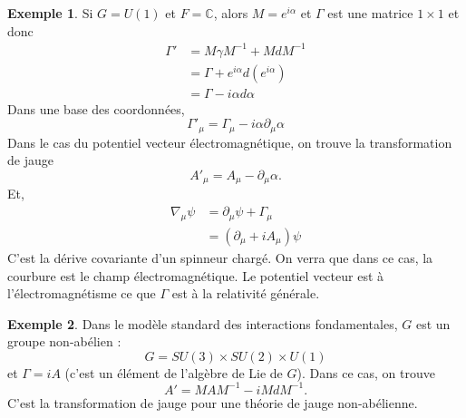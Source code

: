 \documentclass[a4paper,11pt]{report}
\theoremstyle{definition}
\theoremstyle{plain}
\theoremstyle{definition}
\newtheorem{exmp}{Exemple}[chapter]
\theoremstyle{remark}
\newcommand{\p}{\partial}
\begin{document}
            \begin{exmp}
                Si $G = U(1)$ et $F = \mathbb{C}$, alors $M = e^{i\alpha}$ et $\Gamma$ est une matrice $1\times1$ et donc
                \begin{align}
                    \Gamma' &= M\gamma M^{-1} + MdM^{-1} \\
                    &= \Gamma + e^{i\alpha}d(e^{i\alpha}) \\
                    &= \Gamma-i\alpha d\alpha
                \end{align}
                Dans une base des coordonnées,
                \begin{equation}
                    \Gamma'_\mu = \Gamma_\mu-i\alpha\p_\mu\alpha
                \end{equation}
                Dans le cas du potentiel vecteur électromagnétique, on trouve la transformation de jauge
                \begin{equation}
                    A'_\mu = A_\mu - \p_\mu\alpha.
                \end{equation}
                Et, 
                \begin{align}
                    \nabla_\mu\psi &= \p_\mu\psi + \Gamma_\mu \\
                    &= (\p_\mu+iA_\mu)\psi
                \end{align}
                C'est la dérive covariante d'un spinneur chargé. On verra que dans ce cas, la courbure est le champ électromagnétique. Le potentiel vecteur est à l'électromagnétisme ce que $\Gamma$ est à la relativité générale.
            \end{exmp}
            
            \begin{exmp}
                Dans le modèle standard des interactions fondamentales, $G$ est un groupe non-abélien :
                \begin{equation}
                    G = SU(3)\times SU(2)\times U(1)
                \end{equation}
                et $\Gamma = iA$ (c'est un élément de l'algèbre de Lie de $G$). Dans ce cas, on trouve
                \begin{equation}
                    A' = MAM^{-1}-iMdM^{-1}.
                \end{equation}
                C'est la transformation de jauge pour une théorie de jauge non-abélienne.
            \end{exmp}
        
\end{document}
